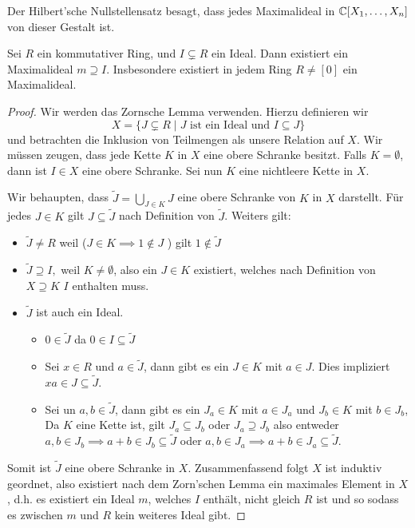 \begin{remark}
	Der Hilbert'sche Nullstellensatz besagt, dass jedes Maximalideal in $\mathbb{C}[X_1,\ldots,X_{n}]$ von dieser Gestalt ist.
\end{remark}

\begin{theorem}
	Sei $R$ ein kommutativer Ring, und $I \subsetneq R$ ein Ideal. Dann existiert ein Maximalideal $m \supseteq I$.
	Insbesondere existiert in jedem Ring $R \neq [0]$ ein Maximalideal.
\end{theorem}

\begin{proof}
	Wir werden das Zornsche Lemma verwenden. Hierzu definieren wir
	\[
	X = \{J \subsetneq R \mid J \text{ ist ein Ideal und } I \subseteq J\} 
	\]
	und betrachten die Inklusion von Teilmengen als unsere Relation auf $X$.
	Wir müssen zeugen, dass jede Kette $K$ in $X$ eine obere Schranke besitzt.
	Falls $K = \emptyset$, dann ist $I \in X$ eine obere Schranke.
	Sei nun $K$ eine nichtleere Kette in $X$.
	
	Wir behaupten, dass $\widetilde{J} = \bigcup_{J \in K} J$ eine obere Schranke von $K$ in $X$ darstellt.
	Für jedes $J \in K$ gilt $J \subseteq \widetilde{J}$ nach Definition von $\widetilde{J}$.
	Weiters gilt:
	\begin{itemize}
		\item $\widetilde{J} \neq R$ weil ($J \in K \implies 1 \not\in J$ ) gilt $1 \not\in \widetilde{J}$ 
		\item $\widetilde{J} \supseteq I,$ weil $K \neq \emptyset$, also ein $J \in K$ existiert, welches nach Definition von $X \supseteq K$ $I$ enthalten muss.
		\item $\widetilde{J}$ ist auch ein Ideal.
			\begin{itemize}
				\item $0 \in \widetilde{J}$ da $0 \in I \subseteq \widetilde{J}$ 
				\item Sei $x \in R$ und $a \in \widetilde{J}$, dann gibt es ein $J \in K$ mit $a \in J$.
					Dies impliziert $xa \in J \subseteq \widetilde{J}$.
				\item Sei un $a,b \in \widetilde{J}$, dann gibt es ein $J_{a} \in K$ mit $a \in J_{a}$ und $J_{b} \in K$ mit $b \in J_{b}$,
					Da $K$ eine Kette ist, gilt $J_{a} \subseteq J_{b}$ oder $J_{a} \supseteq J_{b}$ also entweder $a,b \in J_{b} \implies a + b \in J_{b} \subseteq \widetilde{J}$ oder
					$a,b \in J_{a} \implies a+b \in J_{a} \subseteq \widetilde{J}$.
			\end{itemize}
	\end{itemize}
	Somit ist $\widetilde{J}$ eine obere Schranke in $X$.
	Zusammenfassend folgt $X$ ist induktiv geordnet, also existiert nach dem Zorn'schen Lemma ein maximales Element in $X$, d.h. es existiert ein Ideal $m$,
	welches  $I$ enthält, nicht gleich $R$ ist und so sodass es zwischen $m$ und $R$ kein weiteres Ideal gibt.
\end{proof}


